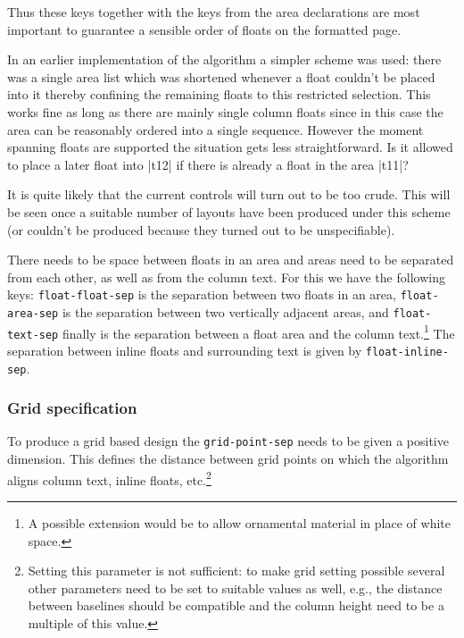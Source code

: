 \documentclass[twocolumn]{article}
\begin{document}
Thus these keys together with the keys from the area
declarations are most important to guarantee a sensible order of
floats on the formatted page.

In an earlier implementation of the algorithm a simpler scheme was
used: there was a single area list which was shortened whenever a
float couldn't be placed into it thereby confining the remaining
floats to this restricted selection. This works fine as long as there
are mainly single column floats since in this case the area can be
reasonably ordered into a single sequence. However the moment spanning
floats are supported the situation gets less straightforward. Is it
allowed to place a later float into |t12| if there is already a float
in the area |t11|?

It is quite likely that the current controls will turn out to be too
crude. This will be seen once a suitable number of layouts have been
produced under this scheme (or couldn't be produced because they
turned out to be unspecifiable).

There needs to be space between floats in an area and areas need to be
separated from each other, as well as from the column text. For this we
have the following keys:
\texttt{float-float-sep} is the separation between two floats in an area,
\texttt{float-area-sep} is the separation between two vertically
adjacent areas, and \texttt{float-text-sep} finally is the separation
between a float area and the column text.\footnote{A possible
extension would be to allow ornamental material in place of white space.}
The separation between inline floats and surrounding text is given by
\texttt{float-inline-sep}.


\subsubsection{Grid specification}

To produce a grid based design the \texttt{grid-point-sep} needs to be
given a positive dimension. This defines the distance between grid
points on which the algorithm aligns column text, inline floats,
etc.\footnote{Setting this parameter is not sufficient: to make grid
setting possible several other parameters need to be set to suitable
values as well, e.g., the distance between baselines should be
compatible and the column height need to be a multiple of this value.}
\end{document}
